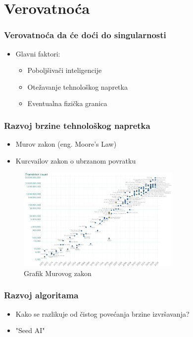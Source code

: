 \documentclass{beamer}
\begin{document}
\section{Verovatnoća}

\begin{frame}[fragile]\frametitle{Verovatnoća da će doći do singularnosti}
    \begin{itemize}	
        \item Glavni faktori:
        \begin{itemize}	
            \item Poboljšivači inteligencije
            \item Otežavanje tehnološkog napretka
            \item Eventualna fizička granica
      \end{itemize}
    \end{itemize}
\end{frame}

\begin{frame}[fragile]\frametitle{Razvoj brzine tehnološkog napretka}
    \begin{itemize}	
        \item Murov zakon (eng. Moore's Law)
        \item Kurcvailov zakon o ubrzanom povratku
    \end{itemize}
    \begin{figure}[h!]
        \centering\includegraphics[height=5cm]{moore.png} 
        \caption{Grafik Murovog zakon}
        \label{fig:murovzakon}
    \end{figure}
\end{frame}


\begin{frame}[fragile]\frametitle{Razvoj algoritama}
    \begin{itemize}	
        \item Kako se razlikuje od čistog povećanja brzine izvršavanja?
        \item "Seed AI"
    \end{itemize}
\end{frame}
\end{document}
